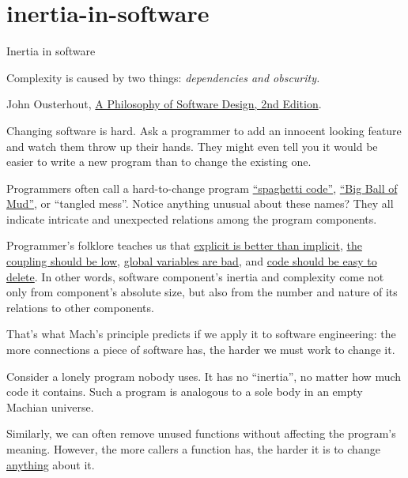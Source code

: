 \documentclass{article}
\begin{document}
\section{inertia-in-software}{Inertia in software}

\epigraph{
  Complexity is caused by two things: \em{dependencies} and \em{obscurity}.
}{John Ousterhout, \href{https://www.amazon.com/Philosophy-Software-Design-2nd/dp/173210221X}{A Philosophy of Software Design, 2nd Edition}.}

Changing software is hard.
Ask a programmer to add an innocent looking feature and watch them throw up their hands.
They might even tell you it would be easier to write a new program than to change the existing one.

Programmers often call a hard-to-change program \href{https://en.wikipedia.org/wiki/Spaghetti_code}{``spaghetti code''}, \href{http://laputan.org/mud/}{``Big Ball of Mud''}, or ``tangled mess''.
Notice anything unusual about these names?
They all indicate intricate and unexpected relations among the program components.

Programmer's folklore teaches us that \href{https://peps.python.org/pep-0020/}{explicit is better than implicit}, \href{https://en.wikipedia.org/wiki/Coupling_%28computer_programming%29}{the coupling should be low}, \href{http://wiki.c2.com/?GlobalVariablesAreBad}{global variables are bad}, and \href{https://programmingisterrible.com/post/139222674273/write-code-that-is-easy-to-delete-not-easy-to}{code should be easy to delete}.
In other words, software component's inertia and complexity come not only from component's absolute size, but also from the number and nature of its relations to other components.

That's what Mach's principle predicts if we apply it to software engineering: the more connections a piece of software has, the harder we must work to change it.

Consider a lonely program nobody uses.
It has no ``inertia'', no matter how much code it contains.
Such a program is analogous to a sole body in an empty Machian universe.

Similarly, we can often remove unused functions without affecting the program's meaning.
However, the more callers a function has, the harder it is to change \href{https://www.hyrumslaw.com/}{anything} about it.
\end{document}
